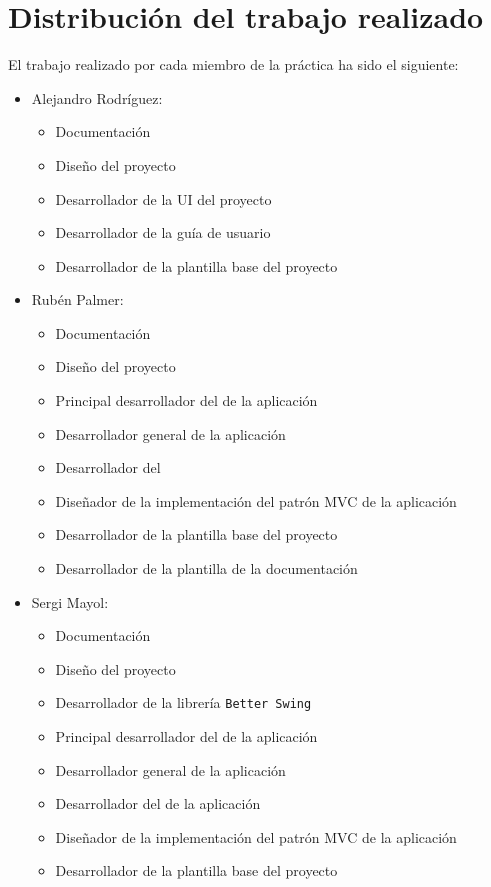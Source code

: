 \section{Distribución del trabajo realizado}

El trabajo realizado por cada miembro de la práctica ha sido el siguiente: \bigskip

\begin{itemize}
    \item Alejandro Rodríguez:
    \begin{itemize}
        \item Documentación
        \item Diseño del proyecto
        \item Desarrollador de la UI del proyecto
        \item Desarrollador de la guía de usuario
        \item Desarrollador de la plantilla base del proyecto
    \end{itemize}
    
    \item Rubén Palmer:
    \begin{itemize}
        \item Documentación
        \item Diseño del proyecto
        \item Principal desarrollador del  de la aplicación
        \item Desarrollador general de la aplicación
        \item Desarrollador del 
        \item Diseñador de la implementación del patrón MVC de la aplicación
        \item Desarrollador de la plantilla base del proyecto
        \item Desarrollador de la plantilla de la documentación 
    \end{itemize}
    \item Sergi Mayol:
    \begin{itemize}
        \item Documentación
        \item Diseño del proyecto
        \item Desarrollador de la librería \texttt{Better Swing}
        \item Principal desarrollador del  de la aplicación
        \item Desarrollador general de la aplicación
        \item Desarrollador del  de la aplicación
        \item Diseñador de la implementación del patrón MVC de la aplicación
        \item Desarrollador de la plantilla base del proyecto
    \end{itemize}
\end{itemize}


